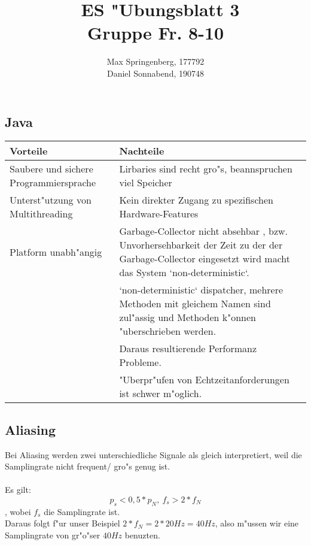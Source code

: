 \documentclass{article}
\author{Max Springenberg, 177792\\
        Daniel Sonnabend, 190748}
\title{\
    ES "Ubungsblatt 3\\
    Gruppe Fr. 8-10
    }
\date{}
\begin{document}
\maketitle
\newpage

\subsection{Java}

\begin{tabular}{|p{7cm}|p{7cm}|}
	\hline
	
	Vorteile 						        & Nachteile\\
    \hline
    Saubere und sichere Programmiersprache  & Lirbaries sind recht gro"s, 
                                              beannspruchen viel Speicher\\
    \hline
    Unterst"utzung von Multithreading       & Kein direkter Zugang zu 
                                              spezifischen Hardware-Features\\
    \hline
    Platform unabh"angig                    & Garbage-Collector nicht absehbar
                                              , bzw. Unvorhersehbarkeit der Zeit
                                              zu der der Garbage-Collector
                                              eingesetzt wird macht das System
                                              `non-deterministic`.\\
    \hline
                                            & `non-deterministic` dispatcher,
                                               mehrere Methoden mit gleichem
                                               Namen sind zul"assig und Methoden
                                               k"onnen "uberschrieben werden.\\
    \hline
                                            & Daraus resultierende Performanz
                                              Probleme.\\
    \hline
                                            & "Uberpr"ufen von 
                                              Echtzeitanforderungen ist schwer
                                              m"oglich.\\
    \hline
\end{tabular}


\subsection{Aliasing}
Bei Aliasing werden zwei unterschiedliche Signale als gleich interpretiert, 
    weil die Samplingrate nicht frequent/ gro"s genug ist.\\
\\
Es gilt:\\$$
    p_s < 0,5 * p_N,\  
    f_s > 2* f_N$$
, wobei $f_s$ die Samplingrate ist.\\
Daraus folgt f"ur unser Beispiel $2*f_N = 2 * 20Hz = 40Hz$, also m"ussen wir
    eine Samplingrate von gr"o"ser $40Hz$  benuzten.\\
\end{document}
